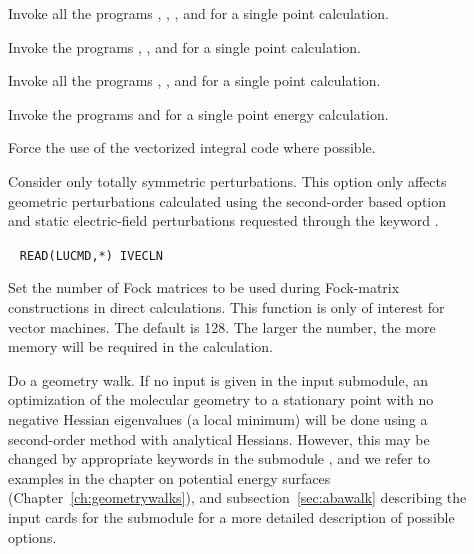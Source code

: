 \begin{description}
\item[]

Invoke all the programs {\her}, {\sir}, {\resp}, and {\aba} for a single point
     calculation.

\item[]

Invoke the programs {\her}, {\sir}, and {\aba} for a single point
calculation.

\item[]

Invoke all the programs {\her}, {\sir}, and {\resp} for a single point
calculation.

\item[]

Invoke the programs {\her} and {\sir} for a single point energy calculation.


\item[] Force the use of the vectorized integral code {\eri} where possible.



\item[] Consider only totally symmetric
perturbations.
This option only affects geometric perturbations calculated using the
second-order based  option and static
electric-field perturbations requested through the keyword .

\item[]\verb| |
\newline
\verb|READ(LUCMD,*) IVECLN|

Set the number of Fock matrices to be used during Fock-matrix constructions in 
direct calculations. This function is only of interest for vector machines.
The default is 128. The larger the number, the more memory will be required 
in the calculation.

\item[] 
Do a geometry walk. If no
input is given in the
 input submodule, an optimization of the molecular
geometry to a stationary point with no
negative Hessian eigenvalues (a
local minimum) will be done using a second-order method with
analytical Hessians. However, this may be changed by appropriate
keywords in the submodule , and we refer to examples in
the chapter on potential energy surfaces
(Chapter~\ref{ch:geometrywalks}), and  subsection~\ref{sec:abawalk}
describing the input cards for the  submodule for a more
detailed description of possible options.


\end{description}
